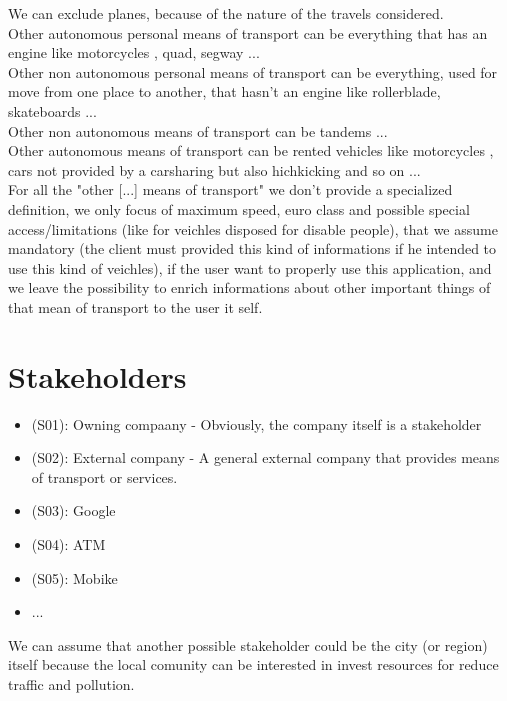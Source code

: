 \documentclass[a4paper,leqno]{book}
\begin{document}
We can exclude planes, because of the nature of the travels considered.\\

Other autonomous personal means of transport can be everything that has an engine like motorcycles , quad, segway ...\\

Other non autonomous personal means of transport can be everything, used for move from one place to another, that hasn't an engine like rollerblade, skateboards ...\\

Other non autonomous means of transport can be tandems ... \\

Other autonomous means of transport can be rented vehicles like motorcycles , cars not provided by a carsharing but also hichkicking and so on ... \\

For all the "other [...] means of transport" we don't provide a specialized definition, we only focus of maximum speed, euro class and possible special access/limitations (like for veichles disposed for disable people), that we assume mandatory (the client must provided this kind of informations if he intended to use this kind of veichles), if the user want to properly use this application, and we leave the possibility to enrich informations about other important things of that mean of transport to the user it self.\\ 


\section{Stakeholders}
\begin{itemize}

\item (S01): Owning compaany - Obviously, the company itself is a stakeholder
\item (S02): External company - A general external company that provides means of transport or services.
\item (S03): Google
\item (S04): ATM
\item (S05): Mobike 
\item ...

\end{itemize}

We can assume that another possible stakeholder could be the city (or region) itself because the local comunity can be interested in invest resources for reduce traffic and pollution.\\
\end{document}

